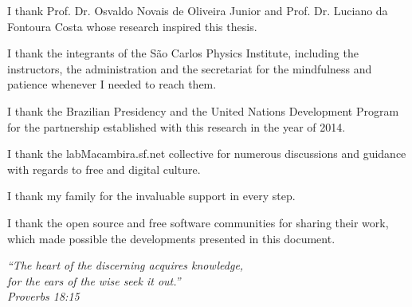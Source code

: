 \documentclass[
12pt,		%
openright,	%
twoside,  %
a4paper,			%
chapter=TITLE,		%
english,			%
french,				%
spanish,			%
brazil				%
]{USPSC}
\begin{document}
\begin{agradecimentos}
	I thank
Prof. Dr. Osvaldo Novais de Oliveira Junior and Prof. Dr. Luciano da Fontoura Costa
whose research inspired this thesis.

I thank the integrants of the São Carlos Physics Institute,
including the instructors, the administration and the secretariat
for the mindfulness and patience whenever I needed to reach them.

I thank the Brazilian Presidency and the United Nations Development Program for
the partnership established with this research in the year of 2014.

I thank the labMacambira.sf.net collective for numerous discussions and guidance
with regards to free and digital culture.

I thank my family for the invaluable support in every step.

I thank the open source and free software communities for sharing their work,
which made possible the developments presented in this document.
% 
% 
% 
\end{agradecimentos}

\begin{epigrafe}
    \vspace*{\fill}
	\begin{flushright}
		\textit{``The heart of the discerning acquires knowledge, \\
		for the ears of the wise seek it out.''\\
		Proverbs 18:15}
	\end{flushright}
\end{epigrafe}
\end{document}
